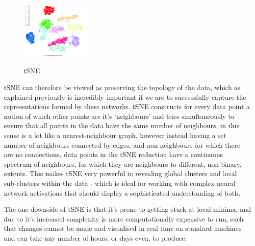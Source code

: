 \documentclass[a4paper,11pt,titlepage]{article}
\begin{document}
	\begin{figure}[H]
    			\centering	
			{{\includegraphics[width=0.3\textwidth]
    				{img/hinton_tsne.png} 
    			}}%
    			\caption{tSNE}%
    		\label{fig:3nn}
	\end{figure}	  
	
		tSNE can therefore be viewed as preserving the topology of the data, which as explained previously is incredibly important if we are to successfully capture the representations formed by these networks. tSNE constructs for every data point a notion of which other points are it's `neighbours' and tries simultaneously to ensure that all points in the data have the same number of neighbours, in this sense is a lot like a nearest-neighbour graph, however instead having a set number of neighbours connected by edges, and non-neighbours for which there are no connections, data points in the tSNE reduction have a continuous spectrum of neighbours, for which they are neighbours to different, non-binary, extents. This makes tSNE very powerful in revealing global clusters and local sub-clusters within the data - which is ideal for working with complex neural network activations that should display a sophisticated understanding of both.
		\par
		 The one downside of tSNE is that it's prone to getting stuck at local minima, and due to it's increased complexity is more computationally expensive to run, such that changes cannot be made and visualised in real time on standard machines and can take any number of hours, or days even, to produce.  
		 
\end{document}
